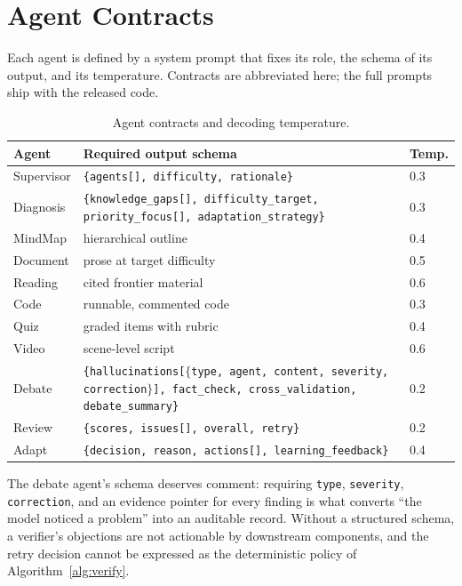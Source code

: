 \section{Agent Contracts}
\label{sec:appendix}

Each agent is defined by a system prompt that fixes its role, the schema of
its output, and its temperature. Contracts are abbreviated here; the full
prompts ship with the released code.

\begin{table}[!h]
\centering
\caption{Agent contracts and decoding temperature.}
\label{tab:contracts}
\begin{tabular}{@{}p{1.9cm}p{3.1cm}p{1.4cm}@{}}
\toprule
\textbf{Agent} & \textbf{Required output schema} & \textbf{Temp.} \\
\midrule
Supervisor & \texttt{\{agents[], difficulty, rationale\}} & 0.3 \\
Diagnosis & \texttt{\{knowledge\_gaps[], difficulty\_target, priority\_focus[], adaptation\_strategy\}} & 0.3 \\
MindMap & hierarchical outline & 0.4 \\
Document & prose at target difficulty & 0.5 \\
Reading & cited frontier material & 0.6 \\
Code & runnable, commented code & 0.3 \\
Quiz & graded items with rubric & 0.4 \\
Video & scene-level script & 0.6 \\
Debate & \texttt{\{hallucinations[$\{$type, agent, content, severity, correction$\}$], fact\_check, cross\_validation, debate\_summary\}} & 0.2 \\
Review & \texttt{\{scores, issues[], overall, retry\}} & 0.2 \\
Adapt & \texttt{\{decision, reason, actions[], learning\_feedback\}} & 0.4 \\
\bottomrule
\end{tabular}
\end{table}

The debate agent's schema deserves comment: requiring \texttt{type},
\texttt{severity}, \texttt{correction}, and an evidence pointer for every
finding is what converts ``the model noticed a problem'' into an auditable
record. Without a structured schema, a verifier's objections are not
actionable by downstream components, and the retry decision cannot be
expressed as the deterministic policy of Algorithm~\ref{alg:verify}.
